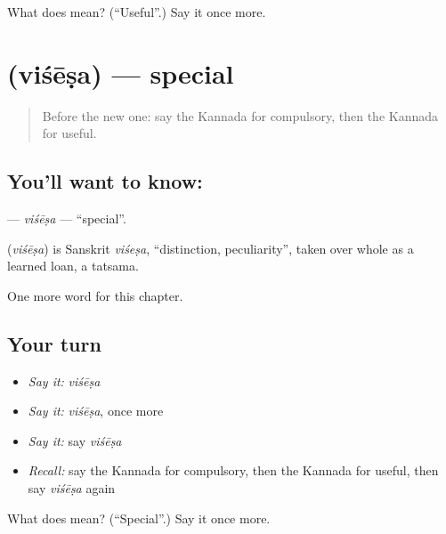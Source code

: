 \begin{tcolorbox}[breakable,colback=teal!4,colframe=teal!35!black,title={Before you move on}]
What does  mean? (\textquotedblleft{}Useful\textquotedblright{}.) Say it once more.
\end{tcolorbox}
\section[\texorpdfstring{\kn{ವಿಶೇಷ} (viśēṣa)}{ವಿಶೇಷ (viśēṣa)}]{ (viśēṣa) — special}

\label{lesson:KA-C181-visesa}



\begin{quote}
Before the new one: say the Kannada for compulsory, then the Kannada for useful.
\end{quote}

\subsection*{You'll want to know: }
\textbf{} — \emph{viśēṣa} — \textquotedblleft{}special\textquotedblright{}.

\begin{cousinweb}
\textbf{} (\emph{viśēṣa}) is Sanskrit \emph{viśeṣa}, \textquotedblleft{}distinction, peculiarity\textquotedblright{}, taken over whole as a learned loan, a tatsama.
\end{cousinweb}

\begin{grammarlens}[title={What you've built}]
One more word for this chapter.
\end{grammarlens}

\subsection*{Your turn}
\begin{itemize}
\raggedright
  \item \emph{Say it:} \emph{viśēṣa}
  \item \emph{Say it:} \emph{viśēṣa}, once more
  \item \emph{Say it:} say \emph{viśēṣa}
  \item \emph{Recall:} say the Kannada for compulsory, then the Kannada for useful, then say \emph{viśēṣa} again
\end{itemize}

\begin{tcolorbox}[breakable,colback=teal!4,colframe=teal!35!black,title={Before you move on}]
What does  mean? (\textquotedblleft{}Special\textquotedblright{}.) Say it once more.
\end{tcolorbox}
